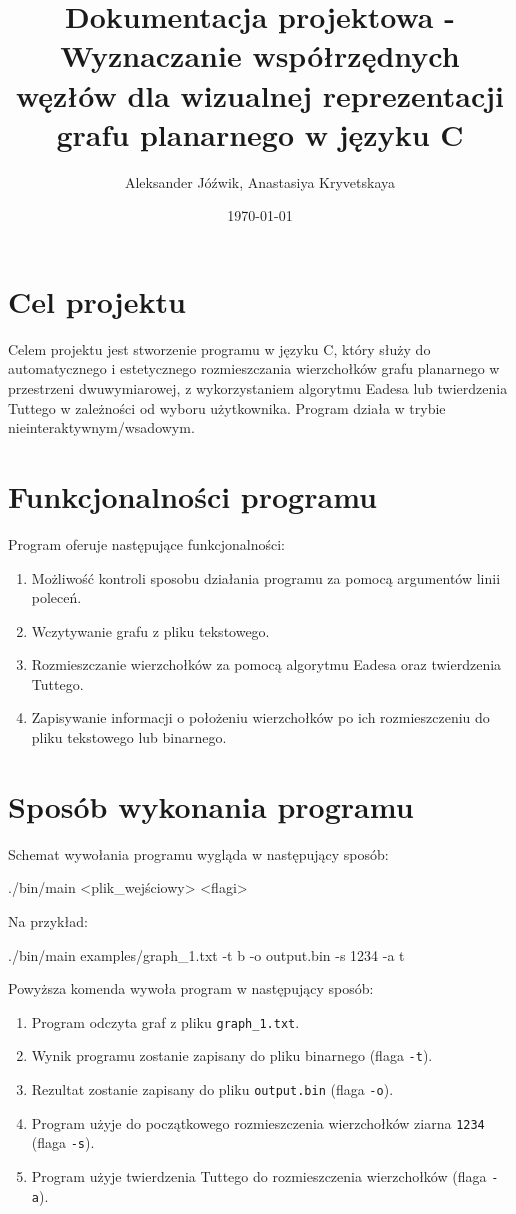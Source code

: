 \documentclass[]{article}
\title{Dokumentacja projektowa - Wyznaczanie współrzędnych węzłów dla wizualnej reprezentacji grafu planarnego w języku C}
\author{\authoricon Aleksander Jóźwik, Anastasiya Kryvetskaya}
\date{\dateicon \today}
\begin{document}
	\noindent
	\maketitle

	\tableofcontents
	\clearpage

	\section{Cel projektu}
	Celem projektu jest stworzenie programu w języku C, który służy do automatycznego i estetycznego rozmieszczania
	wierzchołków grafu planarnego w przestrzeni dwuwymiarowej, z wykorzystaniem algorytmu Eadesa lub twierdzenia 
	Tuttego w zależności od wyboru użytkownika. Program działa w trybie nieinteraktywnym/wsadowym.
	\section{Funkcjonalności programu}
	Program oferuje następujące funkcjonalności:
	\begin{enumerate}
		\item Możliwość kontroli sposobu działania programu za pomocą argumentów linii poleceń.
		\item Wczytywanie grafu z pliku tekstowego.
		\item Rozmieszczanie wierzchołków za pomocą algorytmu Eadesa oraz twierdzenia Tuttego.
		\item Zapisywanie informacji o położeniu wierzchołków po ich rozmieszczeniu do pliku tekstowego lub binarnego.
		
	\end{enumerate}
	
	\section{Sposób wykonania programu}
	Schemat wywołania programu wygląda w następujący sposób:
	\begin{mylisting}
./bin/main <plik_wejściowy> <flagi>
	\end{mylisting}
	Na przykład:
	\begin{mylisting}
./bin/main examples/graph_1.txt -t b -o output.bin -s 1234 -a t
	\end{mylisting}
	Powyższa komenda wywoła program w następujący sposób:
	\begin{enumerate}
		\item Program odczyta graf z pliku \texttt{graph\_1.txt}.
		\item Wynik programu zostanie zapisany do pliku binarnego (flaga \texttt{-t}).
		\item Rezultat zostanie zapisany do pliku \texttt{output.bin} (flaga \texttt{-o}).
		\item Program użyje do początkowego rozmieszczenia wierzchołków ziarna \texttt{1234} (flaga \texttt{-s}).
		\item Program użyje twierdzenia Tuttego do rozmieszczenia wierzchołków (flaga \texttt{-a}).
	\end{enumerate}
\end{document}
